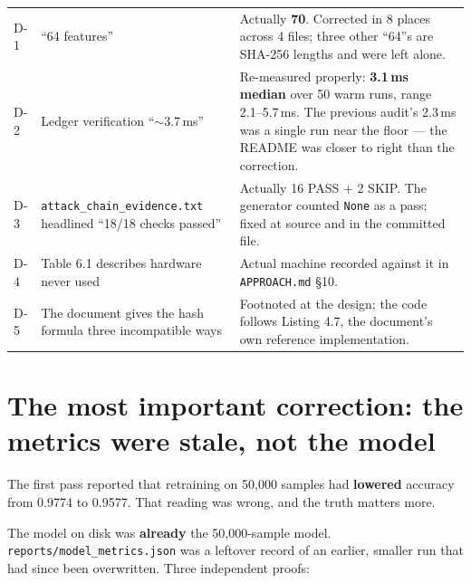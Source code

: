 \documentclass[11pt,a4paper]{article}
\begin{document}
\begin{xltabular}{\linewidth}{@{}K{0.9cm}Y{0.72}Y{1.28}@{}}
D-1 & ``64 features''
    & Actually \textbf{70}. Corrected in 8 places across 4 files; three other ``64''s are
      SHA-256 lengths and were left alone. \\

D-2 & Ledger verification ``$\sim$3.7\,ms''
    & Re-measured properly: \textbf{3.1\,ms median} over 50 warm runs, range 2.1--5.7\,ms.
      The previous audit's 2.3\,ms was a single run near the floor --- the README was
      closer to right than the correction. \\

D-3 & \texttt{attack\_chain\_evidence.txt} headlined ``18/18 checks passed''
    & Actually 16 PASS + 2 SKIP. The generator counted \texttt{None} as a pass; fixed at
      source and in the committed file. \\

D-4 & Table 6.1 describes hardware never used
    & Actual machine recorded against it in \texttt{APPROACH.md} \S10. \\

D-5 & The document gives the hash formula three incompatible ways
    & Footnoted at the design; the code follows Listing 4.7, the document's own reference
      implementation. \\
\end{xltabular}

\section{The most important correction: the metrics were stale, not the model}

The first pass reported that retraining on 50,000 samples had \textbf{lowered}
accuracy from 0.9774 to 0.9577. That reading was wrong, and the truth matters
more.

The model on disk was \textbf{already} the 50,000-sample model.
\texttt{reports/model\_metrics.json} was a leftover record of an earlier, smaller run
that had since been overwritten. Three independent proofs:
\end{document}
